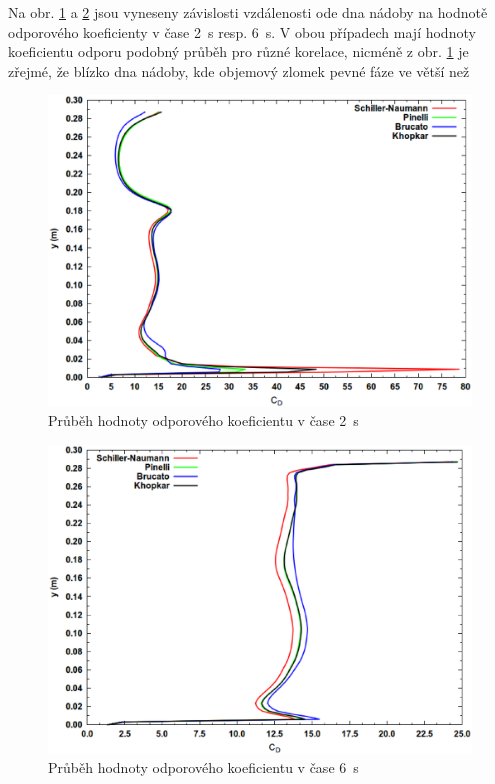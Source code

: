\vspace{-12mm}

\newpage

Na obr. \ref{fig:cd2} a \ref{fig:cd6} jsou vyneseny závislosti vzdálenosti ode dna nádoby na hodnotě odporového koeficienty v čase \SI{2}{\second} resp. \SI{6}{\second}. V obou případech mají hodnoty koeficientu odporu podobný průběh pro různé korelace, nicméně z obr. \ref{fig:cd2} je zřejmé, že blízko dna nádoby, kde objemový zlomek pevné fáze ve větší než   

\begin{figure}[h!]
\begin{center}
\includegraphics[scale=0.47]{images/CD-2.eps}
\caption{Průběh hodnoty odporového koeficientu v čase \SI{2}{\second}}
\label{fig:cd2}
\end{center}
\end{figure} 

\vspace{-12mm}

\begin{figure}[h!]
\begin{center}
\includegraphics[scale=0.47]{images/CD-6.eps}
\caption{Průběh hodnoty odporového koeficientu v čase \SI{6}{\second}}
\label{fig:cd6}
\end{center}
\end{figure} 

\vspace{-12mm}